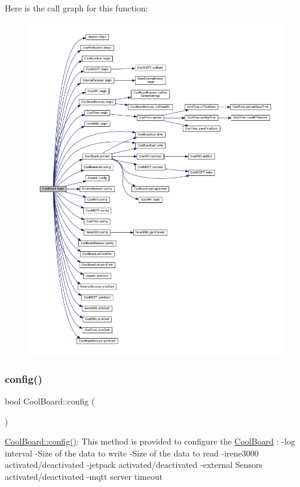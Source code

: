Here is the call graph for this function\+:
\nopagebreak
\begin{figure}[H]
\begin{center}
\leavevmode
\includegraphics[width=350pt]{classCoolBoard_acba7c5aef7268b2c0044bdb54d3b9d76_cgraph}
\end{center}
\end{figure}
\mbox{\label{classCoolBoard_a583a874c09c07e70a6eb9229fc4beddb}} 
\subsubsection{\texorpdfstring{config()}{config()}}
{\footnotesize\ttfamily bool Cool\+Board\+::config (\begin{DoxyParamCaption}{ }\end{DoxyParamCaption})}

\hyperlink{classCoolBoard_a583a874c09c07e70a6eb9229fc4beddb}{Cool\+Board\+::config()}\+: This method is provided to configure the \hyperlink{classCoolBoard}{Cool\+Board} \+: -\/log interval -\/\+Size of the data to write -\/\+Size of the data to read -\/irene3000 activated/deactivated -\/jetpack activated/deactivated -\/external Sensors activated/deactivated -\/mqtt server timeout

